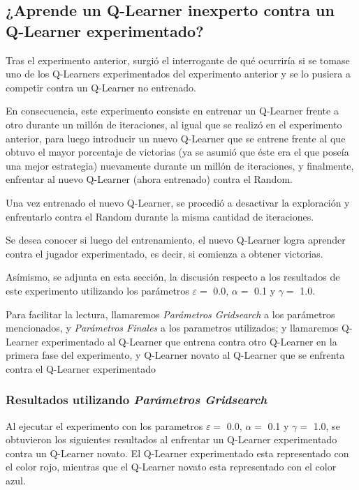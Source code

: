 \subsection{¿Aprende un Q-Learner inexperto contra un Q-Learner experimentado?}

Tras el experimento anterior, surgió el interrogante de qué ocurriría si se tomase uno de los Q-Learners experimentados del experimento anterior y se lo pusiera a competir contra un Q-Learner no entrenado.

En consecuencia, este experimento consiste en entrenar un Q-Learner frente a otro durante un mill\'on de iteraciones, al igual que se realizó en el experimento anterior, para luego introducir un nuevo Q-Learner que se entrene frente al que obtuvo el mayor porcentaje de victorias (ya se asumió que éste era el que poseía una mejor estrategia) nuevamente durante un mill\'on de iteraciones, y finalmente, enfrentar al nuevo Q-Learner (ahora entrenado) contra el Random.

Una vez entrenado el nuevo Q-Learner, se procedió a desactivar la exploración y enfrentarlo contra el Random durante la misma cantidad de iteraciones.

Se desea conocer si luego del entrenamiento, el nuevo Q-Learner logra aprender contra el jugador experimentado, es decir, si comienza a obtener victorias.

Asímismo, se adjunta en esta sección, la discusión respecto a los resultados de este experimento utilizando los parámetros $\varepsilon = $ 0.0, $\alpha = $ 0.1 y $\gamma = $ 1.0.

Para facilitar la lectura, llamaremos \emph{Parámetros Gridsearch} a los parámetros mencionados, y \emph{Parámetros Finales} a los parametros utilizados; y llamaremos Q-Learner experimentado al Q-Learner que entrena contra otro Q-Learner en la primera fase del experimento, y Q-Learner novato al Q-Learner que se enfrenta contra el Q-Learner experimentado

\subsubsection{Resultados utilizando \emph{Parámetros Gridsearch}} %

Al ejecutar el experimento con los parametros $\varepsilon = $ 0.0, $\alpha = $ 0.1 y $\gamma = $ 1.0, se obtuvieron los siguientes resultados al enfrentar un Q-Learner experimentado contra un Q-Learner novato. El Q-Learner experimentado esta representado con el color rojo, mientras que el Q-Learner novato esta representado con el color azul.

